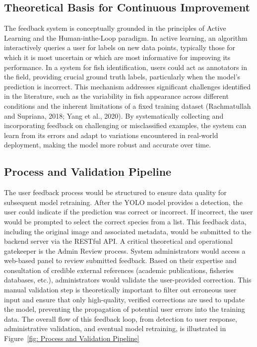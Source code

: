 \subsection{Theoretical Basis for Continuous Improvement}
The feedback system is conceptually grounded in the principles of Active Learning and the Human-inthe-Loop paradigm. In active learning, an algorithm interactively queries a user for labels on new data
points, typically those for which it is most uncertain or which are most informative for improving its performance. In a system for fish identification, users could act as annotators in the field, providing crucial ground
truth labels, particularly when the model’s prediction is incorrect. This mechanism addresses significant
challenges identified in the literature, such as the variability in fish appearance across different conditions
and the inherent limitations of a fixed training dataset (Rachmatullah and Supriana, 2018; Yang et al., 2020).
By systematically collecting and incorporating feedback on challenging or misclassified examples, the system
can learn from its errors and adapt to variations encountered in real-world deployment, making the model
more robust and accurate over time.


\subsection{Process and Validation Pipeline}
The user feedback process would be structured to ensure data quality for subsequent model retraining. After
the YOLO model provides a detection, the user could indicate if the prediction was correct or incorrect. If
incorrect, the user would be prompted to select the correct species from a list. This feedback data, including
the original image and associated metadata, would be submitted to the backend server via the RESTful API.
A critical theoretical and operational gatekeeper is the Admin Review process. System administrators
would access a web-based panel to review submitted feedback. Based on their expertise and consultation of
credible external references (academic publications, fisheries databases, etc.), administrators would validate
the user-provided correction. This manual validation step is theoretically important to filter out erroneous
user input and ensure that only high-quality, verified corrections are used to update the model, preventing
the propagation of potential user errors into the training data.
The overall flow of this feedback loop, from detection to user response, administrative validation, and eventual model retraining, is illustrated in Figure~\ref{fig: Process and Validation Pipeline}


